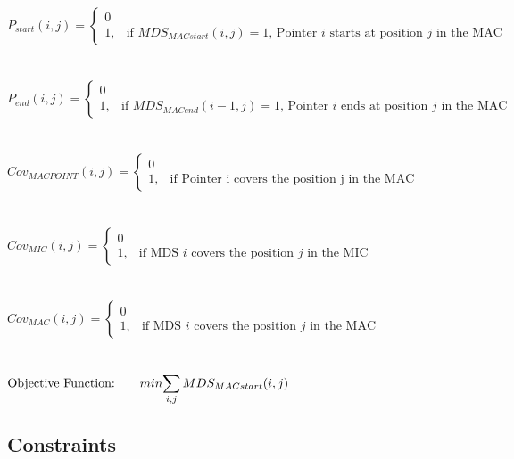 $P_{start}(i,j) = \begin{cases} 0 \\ 1, & \mbox{if } MDS_{MACstart}(i,j) = 1 \mbox{, Pointer } i \mbox{ starts at position } j \mbox{ in the MAC} \end{cases}$ \\\\\\
$P_{end}(i,j) = \begin{cases} 0 \\ 1, & \mbox{if } MDS_{MACend}(i-1,j) = 1 \mbox{, Pointer } i \mbox{ ends at position } j \mbox{ in the MAC} \end{cases}$ \\\\\\
$Cov_{MACPOINT}(i,j) = \begin{cases} 0 \\ 1, & \mbox{if Pointer i covers the position j in the MAC} \end{cases}$ \\\\\\
$Cov_{MIC}(i,j) = \begin{cases} 0 \\ 1, & \mbox{if MDS } i\mbox{ covers the position } j \mbox{ in the MIC} \end{cases}$ \\\\\\
$Cov_{MAC}(i,j) = \begin{cases} 0 \\ 1, & \mbox{if MDS } i\mbox{ covers the position } j \mbox{ in the MAC} \end{cases}$ \\\\\\

$\mbox{Objective Function:} \qquad min \mathlarger{\sum_{i,j} MDS_{MACstart}(i,j)}$

\subsection{Constraints}

